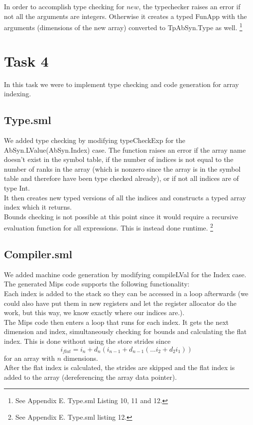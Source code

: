 \documentclass[12pt,a4paper,english]{article}
\begin{document}
In order to accomplish type checking for $new$, the typechecker raises an error if not all the arguments are integers. Otherwise it creates a typed FunApp with the arguments (dimensions of the new array) converted to TpAbSyn.Type as well. 
\footnote{See Appendix E. Type.sml Listing 10, 11 and 12.}
\newpage
\section{Task 4}
In this task we were to implement type checking and code generation for array indexing. 

\subsection{Type.sml}
We added type checking by modifying typeCheckExp for the AbSyn.LValue(AbSyn.Index) case. The function raises an error if the array name doesn't exist in the symbol table, if the number of indices is not equal to the number of ranks in the array (which is nonzero since the array is in the symbol table and therefore have been type checked already), or if not all indices are of type Int. \\
It then creates new typed versions of all the indices and constructs a typed array index which it returns. \\
Bounds checking is not possible at this point since it would require a recursive evaluation function for all expressions. This is instead done runtime.
\footnote{See Appendix E. Type.sml listing 12.}

\subsection{Compiler.sml}
We added machine code generation by modifying compileLVal for the Index case. The generated Mips code supports the following functionality: \\
Each index is added to the stack so they can be accessed in a loop afterwards (we could also have put them in new registers and let the register allocator do the work, but this way, we know exactly where our indices are.). \\ 
The Mips code then enters a loop that runs for each index. It gets the next dimension and index, simultaneously checking for bounds and calculating the flat index. This is done without using the store strides since
\[i_{flat} = i_n + d_n(i_{n-1} + d_{n-1}(... i_2 + d_2i_1))\]
for an array with $n$ dimensions. \\
After the flat index is calculated, the strides are skipped and the flat index is added to the array (dereferencing the array data pointer). \\
\end{document}
